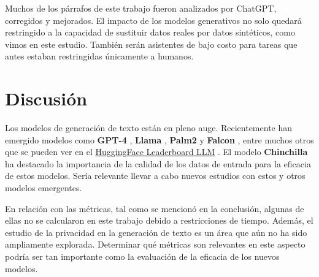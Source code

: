Muchos de los párrafos de este trabajo fueron analizados por ChatGPT, corregidos y mejorados. El impacto de los modelos generativos no solo quedará restringido a la capacidad de sustituir datos reales por datos sintéticos, como vimos en este estudio. También serán asistentes de bajo costo para tareas que antes estaban restringidas únicamente a humanos.


\section{Discusión}
\label{sec:discusion}
Los modelos de generación de texto están en pleno auge. Recientemente han emergido modelos como \textbf{GPT-4} \cite{openai_gpt-4_2023}, \textbf{Llama} \cite{noauthor_llama_nodate}, \textbf{Palm2} \cite{anil_palm_2023} y \textbf{Falcon} \cite{noauthor_falcon_nodate}, entre muchos otros que se pueden ver en el \href{https://huggingface.co/spaces/HuggingFaceH4/open_llm_leaderboard}{HuggingFace Leaderboard LLM} \cite{noauthor_open_nodate}. El modelo \textbf{Chinchilla} \cite{hoffmann_training_2022} ha destacado la importancia de la calidad de los datos de entrada para la eficacia de estos modelos. Sería relevante llevar a cabo nuevos estudios con estos y otros modelos emergentes.

En relación con las métricas, tal como se mencionó en la conclusión, algunas de ellas no se calcularon en este trabajo debido a restricciones de tiempo. Además, el estudio de la privacidad en la generación de texto es un área que aún no ha sido ampliamente explorada. Determinar qué métricas son relevantes en este aspecto podría ser tan importante como la evaluación de la eficacia de los nuevos modelos.
